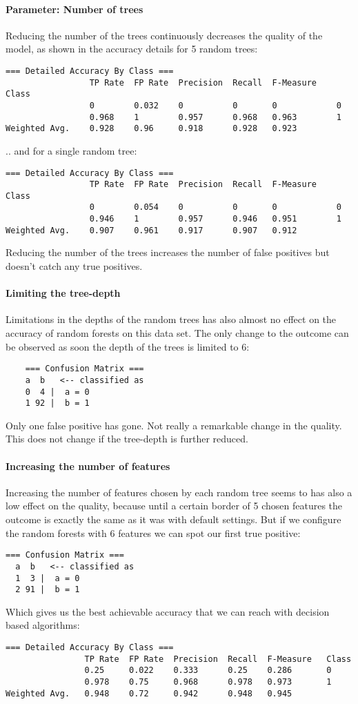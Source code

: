 \documentclass[paper=a4, fontsize=11pt]{scrartcl} %
\numberwithin{equation}{section} %
\numberwithin{figure}{section} %
\numberwithin{table}{section} %
\begin{document}
\paragraph{Parameter: Number of trees}
Reducing the number of the trees continuously decreases the quality of the model, as shown in the accuracy details for 5 random trees:
\begin{lstlisting}
=== Detailed Accuracy By Class ===
                 TP Rate  FP Rate  Precision  Recall  F-Measure    Class
                 0        0.032    0          0       0            0  
                 0.968    1        0.957      0.968   0.963        1   
Weighted Avg.    0.928    0.96     0.918      0.928   0.923    
\end{lstlisting}
.. and for a single random tree:
\begin{lstlisting}
=== Detailed Accuracy By Class ===
                 TP Rate  FP Rate  Precision  Recall  F-Measure    Class
                 0        0.054    0          0       0            0  
                 0.946    1        0.957      0.946   0.951        1   
Weighted Avg.    0.907    0.961    0.917      0.907   0.912    
\end{lstlisting}
Reducing the number of the trees increases the number of false positives but doesn't catch any true positives.
\paragraph{Limiting the tree-depth}
Limitations in the depths of the random trees has also almost no effect on the accuracy of random forests on this data set. The only change to the outcome can be observed as soon the depth of the trees is limited to 6:
\begin{lstlisting}
    === Confusion Matrix ===
    a  b   <-- classified as
    0  4 |  a = 0
    1 92 |  b = 1
\end{lstlisting}
Only one false positive has gone. Not really a remarkable change in the quality. This does not change if the tree-depth is further reduced.
\paragraph{Increasing the number of features}
Increasing the number of features chosen by each random tree seems to has also a low effect on the quality, because until a certain border of 5 chosen features the outcome is exactly the same as it was with default settings. But if we configure the random forests with 6 features we can spot our first true positive:
\begin{lstlisting}
=== Confusion Matrix ===
  a  b   <-- classified as
  1  3 |  a = 0
  2 91 |  b = 1
\end{lstlisting}
Which gives us the best achievable accuracy that we can reach with decision based algorithms:
\begin{lstlisting}
=== Detailed Accuracy By Class ===
                TP Rate  FP Rate  Precision  Recall  F-Measure   Class
                0.25     0.022    0.333      0.25    0.286       0
                0.978    0.75     0.968      0.978   0.973       1
Weighted Avg.   0.948    0.72     0.942      0.948   0.945      
\end{lstlisting}
\end{document}
